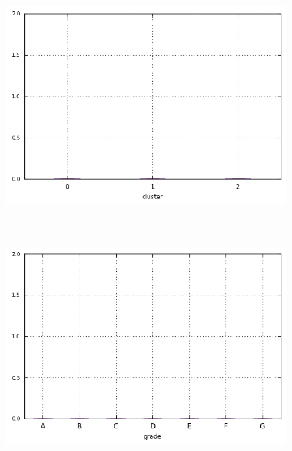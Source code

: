 \begin{anexosenv}
\begin{figure}[t!]
\begin{subfigure}[t]{0.45\textwidth}
            \centerline{\includegraphics[width=1.05\textwidth]{img/pub_rec_by_cluster}}
        \end{subfigure}%
        ~ 
        \begin{subfigure}[t]{0.45\textwidth}
            \centering
   
            \centerline{\includegraphics[width=1.05\textwidth]{img/pub_rec_by_grade}}

        \end{subfigure}
\\
                \caption{\emph{Boxplots} de inq\textunderscore last\textunderscore 6mths}
        \begin{subfigure}[t]{0.45\textwidth}
            \centering


\end{subfigure}
\end{figure}
\end{anexosenv}
